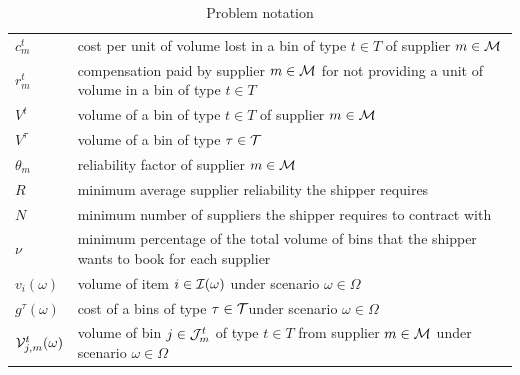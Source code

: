 \documentclass[a4paper,11pt]{article}
\begin{document}
\begin{table}[!ht]
\begin{tabular}{p{2.5cm}p{10.5cm}}
			$c^t_m$ & cost per unit of volume lost in a bin of type $t \in T$ of supplier $m \in \cal{M}$ \\
			$r^t_m$ & compensation paid by supplier $m \in \cal{M}$ for not providing a unit of volume in a bin of type $t \in T$ \\ 
			$V^{t}$ & volume of a bin of type $t \in T$ of supplier $m \in \cal{M}$ \\
			$V^{\tau}$ & volume of a bin of type $\tau \in \cal T$ \\
			$\theta_{m}$ & reliability factor of supplier $m \in \cal{M}$ \\
			$R$ & minimum average supplier reliability the shipper requires \\
			$N$ & minimum number of suppliers the shipper requires to contract with \\
			$\nu$ & minimum percentage of the total volume of bins that the shipper wants to book for each supplier \\ 
			$v_i(\omega)$ &  volume of item $i \in {\cal I}(\omega)$ under scenario $ \omega \in \Omega$ \\
			$g^\tau(\omega)$ & cost of a bins of type $\tau \in {\cal T}$under scenario $ \omega \in \Omega$ \\ %
			${\cal V}_{j,m}^t(\omega)$ & volume of bin $j \in {\cal J}^{t}_{m}$ of type $t \in T$ from supplier $m \in \cal M$ under scenario $ \omega \in \Omega$ \\
			\hline
		\end{tabular}
		\caption{Problem notation}
		\label{tab:notation}
	\end{table}
	
\end{document}
